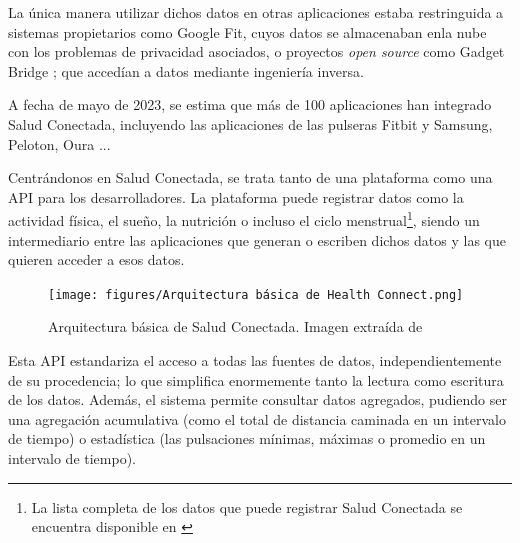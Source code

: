             La única manera utilizar dichos datos 
            en otras aplicaciones estaba restringuida a sistemas propietarios como Google Fit, cuyos datos se 
            almacenaban enla nube con los problemas de privacidad asociados, o proyectos \textit{open source} como 
            Gadget Bridge \cite{freeyourgadget_gadgetbridge_nodate}; que accedían a datos mediante ingeniería inversa.
            \newline

            A fecha de mayo de 2023, se estima que más de 100 aplicaciones han integrado Salud Conectada, incluyendo
            las aplicaciones de las pulseras Fitbit y Samsung, Peloton, Oura \cite{malik_googles_2023}... \newline

            Centrándonos en Salud Conectada, se trata tanto de una plataforma como una API para los desarrolladores.
            La plataforma puede registrar datos como la actividad física, el sueño, la nutrición o incluso el ciclo
            menstrual\footnote{La lista completa de los datos que puede registrar Salud Conectada se encuentra 
            disponible en \cite{noauthor_lista_nodate}}, siendo un intermediario entre las aplicaciones que generan 
            o escriben dichos datos y las que quieren acceder a esos datos. \newline

            \begin{figure}[h]
                \centering
                \texttt{[image: figures/Arquitectura básica de Health Connect.png]}
                \caption[Arquitectura básica de Salud Conectada.]
                {Arquitectura básica de  Salud Conectada. Imagen extraída de \cite{wilk_introducing_2022}}
                \label{figure:health_connect:arquitectura}
            \end{figure}

            Esta API estandariza el acceso a todas las fuentes de datos, independientemente de su procedencia; lo que
            simplifica enormemente tanto la lectura como escritura de los datos. Además, el sistema permite consultar
            datos agregados, pudiendo ser una agregación acumulativa (como el total de distancia caminada en un 
            intervalo de tiempo) o estadística (las pulsaciones mínimas, máximas o promedio en un intervalo de tiempo).

